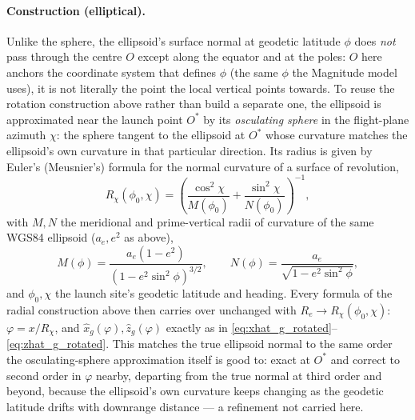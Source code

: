 \paragraph{Construction (elliptical).} Unlike the sphere, the ellipsoid's surface normal at
geodetic latitude $\phi$ does \emph{not} pass through the centre $O$ except along the equator and
at the poles: $O$ here anchors the coordinate system that defines $\phi$ (the same $\phi$ the
Magnitude model uses), it is not literally the point the local vertical points towards. To reuse
the rotation construction above rather than build a separate one, the ellipsoid is approximated
near the launch point $O^*$ by its \emph{osculating sphere} in the flight-plane azimuth $\chi$:
the sphere tangent to the ellipsoid at $O^*$ whose curvature matches the ellipsoid's own curvature
in that particular direction. Its radius is given by Euler's (Meusnier's) formula for the normal
curvature of a surface of revolution,
\begin{equation}
    R_\chi(\phi_0,\chi) = \left(\frac{\cos^2\chi}{M(\phi_0)} + \frac{\sin^2\chi}{N(\phi_0)}\right)^{-1},
\end{equation}
with $M,N$ the meridional and prime-vertical radii of curvature of the same WGS84 ellipsoid
($a_e,e^2$ as above),
\begin{equation}
    M(\phi) = \frac{a_e(1-e^2)}{(1-e^2\sin^2\phi)^{3/2}}, \qquad
    N(\phi) = \frac{a_e}{\sqrt{1-e^2\sin^2\phi}},
\end{equation}
and $\phi_0,\chi$ the launch site's geodetic latitude and heading. Every formula of the radial
construction above then carries over unchanged with $R_e\to R_\chi(\phi_0,\chi)$: $\varphi =
x/R_\chi$, and $\hat{x}_g(\varphi),\hat{z}_g(\varphi)$ exactly as in
\autoref{eq:xhat_g_rotated}--\autoref{eq:zhat_g_rotated}. This matches the true ellipsoid normal to
the same order the osculating-sphere approximation itself is good to: exact at $O^*$ and correct
to second order in $\varphi$ nearby, departing from the true normal at third order and beyond,
because the ellipsoid's own curvature keeps changing as the geodetic latitude drifts with
downrange distance --- a refinement not carried here.

